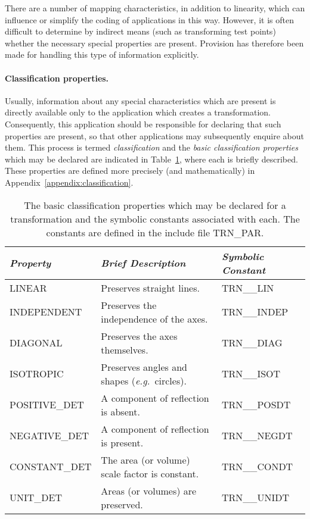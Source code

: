 \documentclass[twoside,11pt]{article}
\newcommand{\name}[1]{\mbox{\small{#1}}}
\begin{document}
There are a number of mapping characteristics, in addition to linearity,
which can influence or simplify the coding of applications in this way.
However, it is often difficult to determine by indirect means (such as
transforming test points) whether the necessary special properties are
present. 
Provision has therefore been made for handling this type of information
explicitly. 

\paragraph{Classification properties.}
Usually, information about any special characteristics which are present is
directly available only to the application which creates a transformation. 
Consequently, this application should be responsible for declaring that such
properties are present, so that other applications may subsequently enquire
about them. 
This process is termed \emph{classification} and the \emph{basic classification
properties} which may be declared are indicated in
Table~\ref{table:classification}, where each is briefly described. 
These properties are defined more precisely (and mathematically) in
Appendix~\ref{appendix:classification}. 

\begin{table}[h]
\begin{center}

\begin{tabular}{|l|l|l|}
\hline
\emph{Property} & \emph{Brief Description} & \emph{Symbolic Constant} 
\\ \hline
LINEAR & Preserves straight lines. & TRN\_\_LIN \\
INDEPENDENT & Preserves the independence of the axes. & TRN\_\_INDEP \\
DIAGONAL & Preserves the axes themselves. & TRN\_\_DIAG \\
ISOTROPIC & Preserves angles and shapes (\emph{e.g.}\ circles). & TRN\_\_ISOT \\
POSITIVE\_DET & A component of reflection is absent. & TRN\_\_POSDT \\
NEGATIVE\_DET & A component of reflection is present. & TRN\_\_NEGDT \\
CONSTANT\_DET & The area (or volume) scale factor is constant. & TRN\_\_CONDT \\
UNIT\_DET & Areas (or volumes) are preserved. & TRN\_\_UNIDT \\
\hline
\end{tabular}

\caption{The basic classification properties which may be declared for a
transformation and the symbolic constants associated with each. 
The constants are defined in the include file \name{TRN\_PAR}.}

\label{table:classification}

\end{center}
\end{table}
\end{document}
